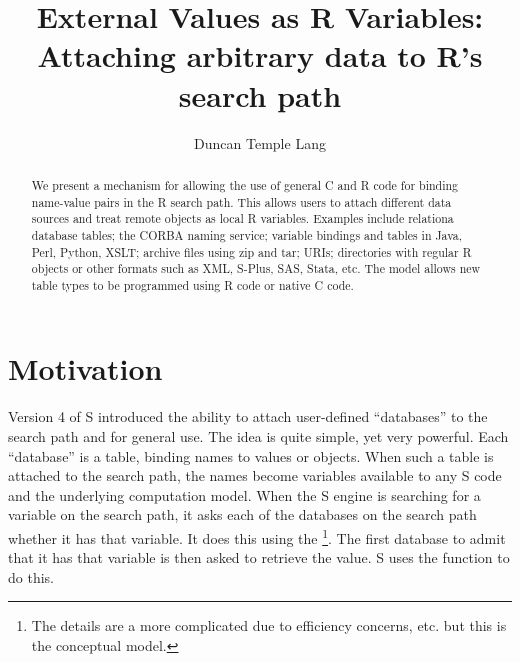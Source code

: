 \documentclass{article}
\title{External Values as R Variables: Attaching arbitrary data to R's
  search path}
\author{Duncan Temple Lang}
\date{}
\begin{document}
\maketitle

\begin{abstract}
 We present a mechanism for allowing the use of general
 C and R code for binding name-value pairs in the R search path.
 This allows users to attach different data sources and treat
 remote objects as local R variables.
 Examples include relationa database tables; the CORBA naming service;
 variable bindings and tables in Java, Perl, Python, XSLT; archive files
 using zip and tar; URIs; directories with regular R objects or
 other formats such as XML, S-Plus, SAS, Stata, etc.
 The model allows new table types to be programmed using
 R code or native C code.
\end{abstract}

\section{Motivation}

Version 4 of S introduced the ability to attach user-defined
``databases'' to the search path and for general use.  The idea is
quite simple, yet very powerful. Each ``database'' is a table, binding
names to values or objects.  When such a table is attached to the
search path, the names become variables available to any S code and
the underlying computation model.  When the S engine is searching for
a variable on the search path, it asks each of the databases on the
search path whether it has that variable.  It does this using the
\footnote{The details are a more complicated due to
  efficiency concerns, etc.  but this is the conceptual model.}.  The
first database to admit that it has that variable is then asked to
retrieve the value. S uses the  function to do this.
\end{document}
